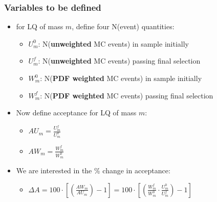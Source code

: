 \documentclass[bigger]{beamer}
\providecommand{\alert}[1]{\textbf{#1}}
\begin{document}
\begin{frame}
\frametitle{Variables to be defined}
\label{sec-2-1-2}
\begin{itemize}

\item for LQ of mass $m$, define four N(event) quantities:
\label{sec-2-1-2-1}%
\begin{itemize}

\item $U_m^0$: N(\alert{unweighted} MC events) in sample initially
\label{sec-2-1-2-1-1}%

\item $U_m^f$: N(\alert{unweighted} MC events) passing final selection
\label{sec-2-1-2-1-2}%

\item $W_m^0$: N(\alert{PDF weighted} MC events) in sample initially
\label{sec-2-1-2-1-3}%

\item $W_m^f$: N(\alert{PDF weighted} MC events) passing final selection
\label{sec-2-1-2-1-4}%
\end{itemize} %

\item Now define acceptance for LQ of mass $m$:
\label{sec-2-1-2-2}%
\begin{itemize}

\item $AU_m = \frac{U_m^f}{U_m^0}$
\label{sec-2-1-2-2-1}%

\item $AW_m = \frac{W_m^f}{W_m^0}$
\label{sec-2-1-2-2-2}%
\end{itemize} %

\item We are interested in the \% change in acceptance:
\label{sec-2-1-2-3}%
\begin{itemize}

\item $\Delta A = 100 \cdot \left[\left(\frac{AW_m}{AU_m} \right) - 1\right] = 100 \cdot \left[\left(\frac{W_m^f}{W_m^0} \cdot \frac{U_m^0}{U_m^f} \right) - 1\right]$
\label{sec-2-1-2-3-1}%
\end{itemize} %
\end{itemize} %
\end{frame}
\end{document}
